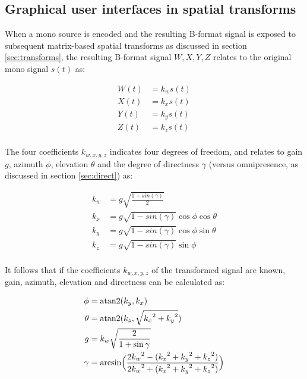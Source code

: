 \documentclass{article}
\begin{document}
\subsection{Graphical user interfaces in spatial transforms}\label{sec:gui}

When a mono source is encoded and the resulting B-format signal is exposed to subsequent matrix-based spatial transforms as discussed in section \ref{sec:transforms}, the resulting B-format signal $W, X, Y, Z$ relates to the original mono signal $s(t)$ as:

\begin{equation} \label{eq:encoded}
\begin{split}
W(t) & = k_w s(t) \\
X(t) & = k_x s(t) \\
Y(t) & = k_y s(t) \\
Z(t) & = k_z s(t) \\
\end{split}
\end{equation}

The four coefficients $k_{w, x, y, z}$ indicates four degrees of freedom, and relates to gain $g$, azimuth $\phi$, elevation $\theta$ and the degree of directness $\gamma$ (versus omnipresence, as discussed in section \ref{sec:direct}) as:

\begin{equation} \label{eq:encodedCoefficients}
\begin{split}
k_w & = g \sqrt{ \frac{1 + sin(\gamma)} {2} } \\
k_x & = g \sqrt{ 1 - sin(\gamma) } \cos{\phi} \cos{\theta} \\
k_y & = g \sqrt{ 1 - sin(\gamma) } \cos{\phi} \sin{\theta} \\
k_z & = g \sqrt{ 1 - sin(\gamma) } \sin{\phi}               \\
\end{split}
\end{equation}

It follows that if the coefficients $k_{w, x, y, z}$ of the transformed signal are known, gain, azimuth, elevation and directness can be calculated as:

\begin{equation} \label{eq:interpreteCoefficients}
\begin{split}
\phi   & = \textnormal{atan2}(k_y, k_x) \\
\theta & = \textnormal{atan2}(k_z, \sqrt{{k_x}^2 + {k_y}^2}) \\
g      & = k_w \sqrt{ \frac{2}{1 + \sin{\gamma} } }\\
\gamma & = \textnormal{arcsin} \Big( \frac{2 {k_w}^2 - ({k_x}^2 + {k_y}^2 +{k_z}^2)} {2 {k_w}^2 + ({k_x}^2 + {k_y}^2 +{k_z}^2 )} \Big)
\end{split}
\end{equation}
\end{document}
